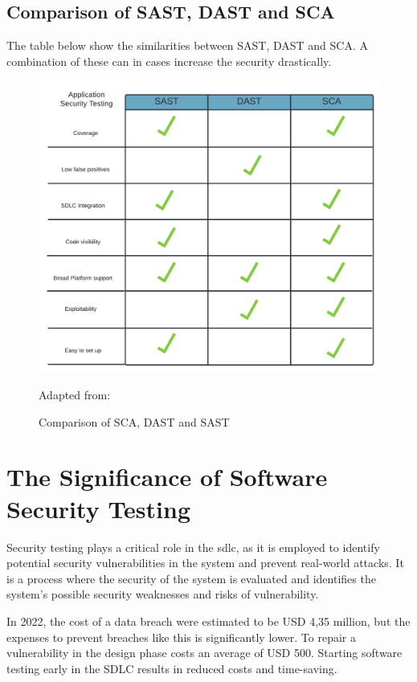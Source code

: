 \subsection{Comparison of SAST, DAST and SCA}
The table below show the similarities between SAST, DAST and SCA. A combination of these can in cases increase the security drastically. 
\begin{figure}[htp]
    \centering
    \includegraphics[width=1\columnwidth]{Images/SCA vs DAST vs SAST.png}
    \caption{Comparison of SCA, DAST and SAST}Adapted from: \cite{Comparison}
    \label{fig:my_label}
\end{figure}



\newpage
\section{The Significance of Software Security Testing}
Security testing plays a critical role in the \acrlong{sdlc}, as it is employed to identify potential security vulnerabilities in the system and prevent real-world attacks. It is a process where the security of the system is evaluated and identifies the system's possible security weaknesses and risks of vulnerability.\cite{whysectest}

In 2022, the cost of a data breach were estimated to be USD 4,35 million\cite{databreach}, but the expenses to prevent breaches like this is significantly lower. To repair a vulnerability in the design phase costs an average of USD 500\cite{fixvulnerability}. Starting software testing early in the SDLC results in reduced costs and time-saving. 

